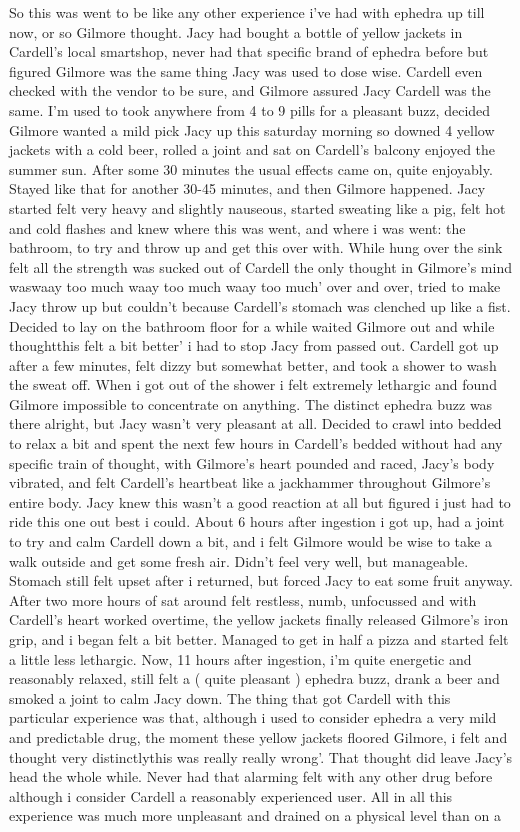 \documentclass[12pt]{book}
\begin{document}
So this was went to be like any other experience i've had with ephedra up till now, or so Gilmore thought. Jacy had bought a bottle of yellow jackets in Cardell's local smartshop, never had that specific brand of ephedra before but figured Gilmore was the same thing Jacy was used to dose wise. Cardell even checked with the vendor to be sure, and Gilmore assured Jacy Cardell was the same. I'm used to took anywhere from 4 to 9 pills for a pleasant buzz, decided Gilmore wanted a mild pick Jacy up this saturday morning so downed 4 yellow jackets with a cold beer, rolled a joint and sat on Cardell's balcony enjoyed the summer sun. After some 30 minutes the usual effects came on, quite enjoyably. Stayed like that for another 30-45 minutes, and then Gilmore happened. Jacy started felt very heavy and slightly nauseous, started sweating like a pig, felt hot and cold flashes and knew where this was went, and where i was went: the bathroom, to try and throw up and get this over with. While hung over the sink felt all the strength was sucked out of Cardell the only thought in Gilmore's mind waswaay too much waay too much waay too much' over and over, tried to make Jacy throw up but couldn't because Cardell's stomach was clenched up like a fist. Decided to lay on the bathroom floor for a while waited Gilmore out and while thoughtthis felt a bit better' i had to stop Jacy from passed out. Cardell got up after a few minutes, felt dizzy but somewhat better, and took a shower to wash the sweat off. When i got out of the shower i felt extremely lethargic and found Gilmore impossible to concentrate on anything. The distinct ephedra buzz was there alright, but Jacy wasn't very pleasant at all. Decided to crawl into bedded to relax a bit and spent the next few hours in Cardell's bedded without had any specific train of thought, with Gilmore's heart pounded and raced, Jacy's body vibrated, and felt Cardell's heartbeat like a jackhammer throughout Gilmore's entire body. Jacy knew this wasn't a good reaction at all but figured i just had to ride this one out best i could. About 6 hours after ingestion i got up, had a joint to try and calm Cardell down a bit, and i felt Gilmore would be wise to take a walk outside and get some fresh air. Didn't feel very well, but manageable. Stomach still felt upset after i returned, but forced Jacy to eat some fruit anyway. After two more hours of sat around felt restless, numb, unfocussed and with Cardell's heart worked overtime, the yellow jackets finally released Gilmore's iron grip, and i began felt a bit better. Managed to get in half a pizza and started felt a little less lethargic. Now, 11 hours after ingestion, i'm quite energetic and reasonably relaxed, still felt a ( quite pleasant ) ephedra buzz, drank a beer and smoked a joint to calm Jacy down. The thing that got Cardell with this particular experience was that, although i used to consider ephedra a very mild and predictable drug, the moment these yellow jackets floored Gilmore, i felt and thought very distinctlythis was really really wrong'. That thought did leave Jacy's head the whole while. Never had that alarming felt with any other drug before although i consider Cardell a reasonably experienced user. All in all this experience was much more unpleasant and drained on a physical level than on a 
\end{document}
